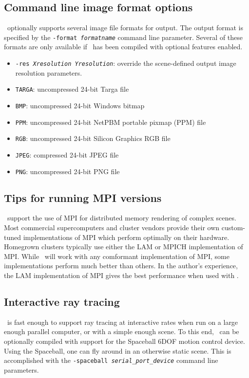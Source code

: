 \subsection{Command line image format options}
\RAY\ optionally supports several image file formats for output.
The output format is specified by the {\tt -format {\it formatname}} 
command line parameter.  Several of these formats are only available if
\RAY\ has been compiled with optional features enabled.

\begin{itemize}
\item{{\tt -res {\it Xresolution Yresolution}}}: override the 
     scene-defined output image resolution parameters.
\item{{\tt TARGA}}: uncompressed 24-bit Targa file
\item{{\tt BMP}}: uncompressed 24-bit Windows bitmap 
\item{{\tt PPM}}: uncompressed 24-bit NetPBM portable pixmap (PPM) file
\item{{\tt RGB}}: uncompressed 24-bit Silicon Graphics RGB file
\item{{\tt JPEG}}: compressed 24-bit JPEG file
\item{{\tt PNG}}: uncompressed 24-bit PNG file
\end{itemize}


\subsection{Tips for running MPI versions}
\RAY\ support the use of MPI for distributed memory rendering
of complex scenes.  Most commercial supercomputers and cluster
vendors provide their own custom-tuned implementations of MPI
which perform optimally on their hardware.  Homegrown clusters
typically use either the LAM or MPICH implementation of MPI.
While \RAY\ will work with any comformant implementation of MPI,
some implementations perform much better than others.  In the
author's experience, the LAM implementation of MPI gives the
best performance when used with \RAY.

\subsection{Interactive ray tracing}
\RAY\ is fast enough to support ray tracing at interactive rates
when run on a large enough parallel computer, or with a simple enough
scene.  To this end, \RAY\ can be optionally compiled with support for
the Spaceball 6DOF motion control device.  Using the Spaceball, one
can fly around in an otherwise static scene.  This is accomplished
with the {\tt -spaceball {\it serial\_port\_device}} command line parameters.
